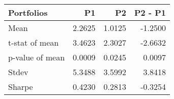 \begin{tabular}{lrrr}
\toprule
Portfolios & P1 & P2 & P2 - P1 \\
\midrule
Mean & 2.2625 & 1.0125 & -1.2500 \\
t-stat of mean & 3.4623 & 2.3027 & -2.6632 \\
p-value of mean & 0.0009 & 0.0245 & 0.0097 \\
Stdev & 5.3488 & 3.5992 & 3.8418 \\
Sharpe & 0.4230 & 0.2813 & -0.3254 \\
\bottomrule
\end{tabular}
